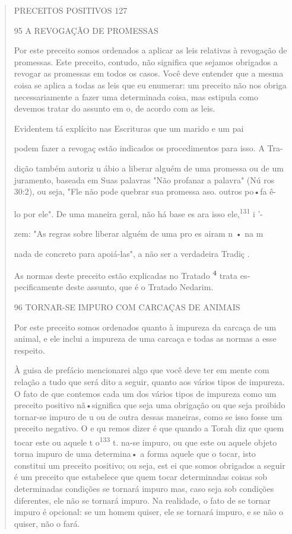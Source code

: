 \begin{quote}
PRECEITOS POSITIVOS 127

95 A REVOGAÇÃO DE PROMESSAS

Por este preceito somos ordenados a aplicar as leis relativas à
revo­gação de promessas. Este preceito, contudo, não significa que
sejamos obriga­dos a revogar as promessas em todos os casos. Você deve
entender que a mes­ma coisa se aplica a todas as leis que eu enumerar:
um preceito não nos obriga necessariamente a fazer uma determinada
coisa, mas estipula como devemos tratar do assunto em o, de acordo com
as leis.

Evidentem tá explícito nas Escrituras que um marido e um pai

podem fazer a revogaç estão indicados os procedimentos para isso. A Tra-

dição também autoriz u ábio a liberar alguém de uma promessa ou de um\\
juramento, baseada em Suas palavras "Não profanar a palavra" (Nú ros\\
30:2), ou seja, "Fle não pode quebrar sua promessa aso. outros po•fa ê-

lo por ele". De uma maneira geral, não há base es ara isso
ele,\textsuperscript{131} i '-

zem: "As regras sobre liberar alguém de uma pro es airam n • na m

nada de concreto para apoiá-las", a não ser a verdadeira Tradiç .

As normas deste preceito estão explicadas no Tratado
\textbf{\textsuperscript{4}} trata es­pecificamente deste assunto, que é
o Tratado Nedarim.

96 TORNAR-SE IMPURO COM CARCAÇAS DE ANIMAIS

Por este preceito somos ordenados quanto à impureza da carcaça de um
animal, e ele inclui a impureza de uma carcaça e todas as normas a esse
respeito.

À guisa de prefácio mencionarei algo que você deve ter em mente com
relação a tudo que será dito a seguir, quanto aos vários tipos de
impureza. O fato de que contemos cada um dos vários tipos de impureza
como um pre­ceito positivo nã•significa que seja uma obrigação ou que
seja proibido tornar-se impuro de u ou de outra dessas maneiras, como se
isso fosse um preceito negativo. O e qu remos dizer é que quando a Torah
diz que quem tocar este ou aquele t o\textsuperscript{133} t. na-se
impuro, ou que este ou aquele objeto torna impuro de uma determina• a
forma aquele que o tocar, isto constitui um preceito posi­tivo; ou seja,
est ei que somos obrigados a seguir é um preceito que estabele­ce que
quem tocar determinadas coisas sob determinadas condições se tornará
impuro mas, caso seja sob condições diferentes, ele não se tornará
impuro. Na realidade, o fato de se tornar impuro é opcional: se um homem
quiser, ele se tornará impuro, e se não o quiser, não o fará.


\end{quote}
